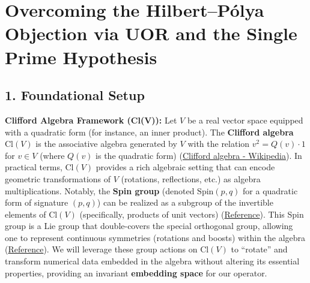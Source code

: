 \documentclass{article}
\begin{document}
\section*{Overcoming the Hilbert--P\'olya Objection via UOR and the Single Prime Hypothesis}

\subsection*{1. Foundational Setup}

\textbf{Clifford Algebra Framework (Cl(V)):} Let $V$ be a real vector space equipped with a quadratic form (for instance, an inner product). The \textbf{Clifford algebra} $\mathrm{Cl}(V)$ is the associative algebra generated by $V$ with the relation $v^2 = Q(v)\cdot 1$ for $v\in V$ (where $Q(v)$ is the quadratic form) (\href{https://en.wikipedia.org/wiki/Clifford_algebra#:~:text=A%20Clifford%20algebra%20is%20a,expressed%20through%20the%20notion%20of}{Clifford algebra - Wikipedia}). In practical terms, $\mathrm{Cl}(V)$ provides a rich algebraic setting that can encode geometric transformations of $V$ (rotations, reflections, etc.) as algebra multiplications. Notably, the \textbf{Spin group} (denoted $\mathrm{Spin}(p,q)$ for a quadratic form of signature $(p,q)$) can be realized as a subgroup of the invertible elements of $\mathrm{Cl}(V)$ (specifically, products of unit vectors) (\href{http://bleyer.org/dw/lib/exe/fetch.php?media=ga:clif_mein.pdf#:~:text=1,Let}{Reference}). This Spin group is a Lie group that double-covers the special orthogonal group, allowing one to represent continuous symmetries (rotations and boosts) within the algebra (\href{http://bleyer.org/dw/lib/exe/fetch.php?media=ga:clif_mein.pdf#:~:text=1,Let}{Reference}). We will leverage these group actions on $\mathrm{Cl}(V)$ to “rotate” and transform numerical data embedded in the algebra without altering its essential properties, providing an invariant \textbf{embedding space} for our operator.

\medskip
\end{document}
